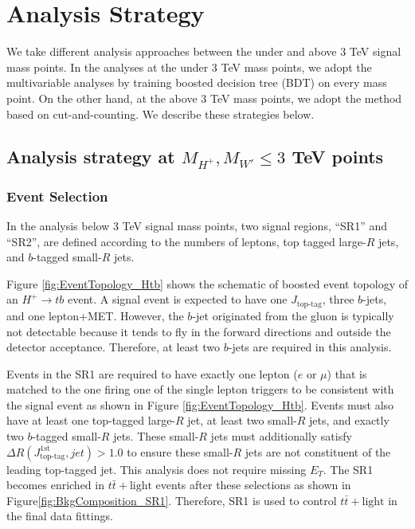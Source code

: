 \section{Analysis Strategy}
\label{sec:AnalysisStrategy}
We take different analysis approaches between the under and above 3 TeV signal mass points. In the analyses at the under 3 TeV mass points, we adopt the multivariable analyses by training boosted decision tree (BDT) on every mass point. On the other hand, at the above 3 TeV mass points, we adopt the method based on cut-and-counting. We describe these strategies below.

\subsection{Analysis strategy at $M_{H^{+}}, M_{W'} \leq 3$ TeV points}
\label{subsec:AnaStrategyUnder3TeV}
\subsubsection{Event Selection}
\label{subsubsec:RegionDefUnder3TeV}
In the analysis below 3 TeV signal mass points, two signal regions, ``SR1'' and ``SR2'', are defined according to the numbers of leptons, top tagged large-$R$ jets, and $b$-tagged small-$R$ jets. 

Figure \ref{fig:EventTopology_Htb} shows the schematic of boosted event topology of an $H^{+}{\rightarrow}tb$ event. A signal event is expected to have one $J_{\text{top-tag}}$, three $b$-jets, and one lepton+MET. However, the $b$-jet originated from the gluon is typically not detectable because it tends to fly in the forward directions and outside the detector acceptance. Therefore, at least two $b$-jets are required in this analysis.

Events in the SR1 are required to have exactly one lepton ($e$ or ${\mu}$) that is matched to the one firing one of the single lepton triggers to be consistent with the signal event as shown in Figure \ref{fig:EventTopology_Htb}. Events must also have at least one top-tagged large-$R$ jet, at least two small-$R$ jets, and exactly two $b$-tagged small-$R$ jets. These small-$R$ jets must additionally satisfy ${\Delta}R(J_{\text{top-tag}}^{1\text{st}}, jet)>1.0$ to ensure these small-$R$ jets are not constituent of the leading top-tagged jet. This analysis does not require missing $E_{T}$. The SR1 becomes enriched in $t\bar{t} + \text{light}$ events after these selections as shown in Figure\ref{fig:BkgComposition_SR1}. Therefore, SR1 is used to control $t\bar{t}+\text{light}$ in the final data fittings.

